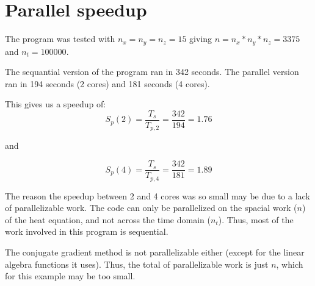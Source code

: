 \section{Parallel speedup}

The program was tested with $n_x=n_y=n_z=15$ giving $n=n_x*n_y*n_z=3375$ and $n_t=100000$.

The sequantial version of the program ran in 342 seconds. 
The parallel version ran in 194 seconds (2 cores) and 181 seconds (4 cores).

This gives us a speedup of:
\begin{equation}
S_p(2) = \frac{T_s}{T_{p,2}} = \frac{342}{194} = 1.76
\end{equation}

and

\begin{equation}
S_p(4) = \frac{T_s}{T_{p,4}} = \frac{342}{181} = 1.89
\end{equation}

The reason the speedup between 2 and 4 cores was so small may be due to a lack of
parallelizable work. The code can only be parallelized on the spacial work ($n$) of the
heat equation, and not across the time domain ($n_t$). Thus, most of the work involved in
this program is sequential.

The conjugate gradient method is not parallelizable either (except for the linear algebra functions it
uses). Thus, the total of parallelizable work is just $n$, which for this example may be too small.

